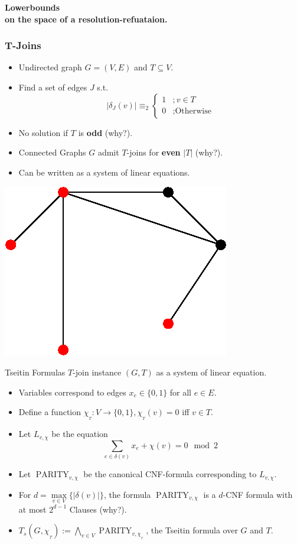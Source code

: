 \documentclass[t,usenames,dvipsnames]{beamer}
\begin{document}
\begin{frame}[c]
	\color{NavyBlue} \centering \Large \textbf{
	Lowerbounds\\on the space of a resolution-refuataion.}
\end{frame}

\begin{frame} \frametitle{T-Joins}
	\begin{itemize}[<+->]
		\item Undirected graph $G = (V, E)$ and $T \subseteq V$.
		\item Find a set of edges $J$ s.t.
			$$
			|\delta_J(v)| \equiv_2
			\begin{cases}
				1&; v \in T\\
				0&; \text{Otherwise}
			\end{cases}
			$$
		\item No solution if $T$ is \textbf{odd} (why?).
		\item Connected Graphs $G$ admit $T$-joins for \textbf{even} $|T|$ (why?).
		\item Can be written as a system of linear equations.
	\end{itemize}
	\begin{center}
		\includegraphics[width=0.35\linewidth]{graph.eps}
	\end{center}
\end{frame}
\begin{frame}{Tseitin Formulas}
	$T$-join instance $(G, T)$ as a system of linear equation.
	\pause
	\begin{itemize}[<+->]
		\item Variables correspond to edges $x_e \in \{0, 1\}$ for all $e \in E$.
		\item Define a function $\chi_{_T}: V \rightarrow \{0, 1\}, \chi_{_T}(v)=0$ iff $v
			\in T$.
		\item Let  $L_{v, \chi}$ be the equation
		$$\sum\limits_{e \in \delta(v)} x_e + \chi(v) = 0 \mod 2$$
		\item Let $\operatorname{PARITY}_{v, \chi}$ be the canonical CNF-formula
			corresponding to  $L_{v, \chi}$.
		\item For $d = \max\limits_{v \in V}\{|\delta(v)|\}$, the formula
			$\operatorname{PARITY}_{v, \chi}$ is a $d$-CNF formula with at most
			$2^{d-1}$ Clauses (why?).
		\item $T_s(G, \chi_{_T}) := \bigwedge_{v \in V} \operatorname{PARITY}_{v,
			\chi_{_T}}$, the Tseitin formula over $G$ and $T$.
	\end{itemize}
\end{frame}
\end{document}
